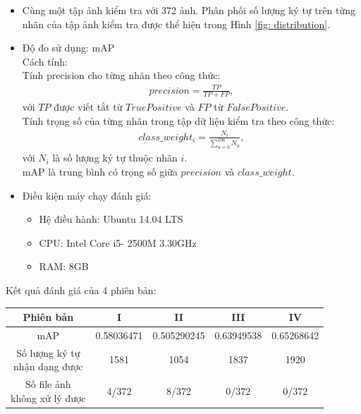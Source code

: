 \documentclass[a4paper]{article}
\theoremstyle{definition}
\begin{document}
	\begin{itemize}
		\item Cùng một tập ảnh kiểm tra với 372 ảnh. Phân phối số lượng ký tự trên từng nhãn của tập ảnh kiểm tra được thể hiện trong Hình \ref{fig: distribution}.
		\item Độ đo sử dụng: mAP\\
		Cách tính:\\ Tính precision cho từng nhãn theo công thức\cite{mAP}:
		\begin{align}
		precision = \frac{TP}{TP+FP},
		\end{align}
		\hspace{2cm}với $TP$ được viết tắt từ $True Positive$\cite{mAP} và $FP$ từ $False Positive$\cite{mAP}.\\
		Tính trọng số của từng nhãn trong tập dữ liệu kiểm tra theo công thức:
		\begin{align}
		class\_weight_i = \frac{N_i}{\sum_{u=0}^{106}N_u},
		\end{align}
		\hspace{2cm}với $N_i$ là số lượng ký tự thuộc nhãn $i$.\\
		mAP là trung bình có trọng số giữa $precision$ và $class\_weight$.
		\item Điều kiện máy chạy đánh giá:
		\begin{itemize}
			\item Hệ điều hành: Ubuntu 14.04 LTS
			\item CPU: Intel Core i5- 2500M 3.30GHz 
			\item RAM: 8GB
		\end{itemize}
	\end{itemize}
	Kết quả đánh giá của 4 phiên bản:
	\vspace{0.5cm}
	\begin{center}
		\begin{tabular}{||c | c | c | c | c||} 
			\hline
			Phiên bản & I&II&III&IV\\[0.5ex] 
			\hline\hline
			mAP&0.58036471&0.505290245&0.63949538&0.65268642\\
			\hline
			\makecell{Số lượng ký tự\\ nhận dạng được}&1581&1054&1837&1920\\
			\hline
			\makecell{Số file ảnh\\ không xử lý được}&4/372&8/372&0/372&0/372\\
			\hline
		\end{tabular}
	\end{center}
\end{document}

